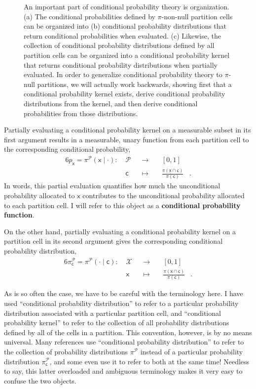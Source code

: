 \documentclass[
  letterpaper,
  DIV=11,
  numbers=noendperiod]{scrartcl}
\begin{document}
\begin{figure}
\caption{\label{fig-conditional-organization}An important part of
conditional probability theory is organization. (a) The conditional
probabilities defined by \(\pi\)-non-null partition cells can be
organized into (b) conditional probability distributions that return
conditional probabilities when evaluated. (c) Likewise, the collection
of conditional probability distributions defined by all partition cells
can be organized into a conditional probability kernel that returns
conditional probability distributions when partially evaluated. In order
to generalize conditional probability theory to \(\pi\)-null partitions,
we will actually work backwards, showing first that a conditional
probability kernel exists, derive conditional probability distributions
from the kernel, and then derive conditional probabilities from those
distributions.}

\end{figure}%

Partially evaluating a conditional probability kernel on a measurable
subset in its first argument results in a measurable, unary function
from each partition cell to the corresponding conditional probability,
\begin{alignat*}{6}
p_{\mathsf{x}}
=
\pi^{\mathcal{P}}( \mathsf{x} \mid \cdot )
:\; &\mathcal{P}& &\rightarrow& \; &[0, 1]&
\\
&\mathsf{c}& &\mapsto&
&\frac{ \pi(\mathsf{x} \cap \mathsf{c}) }{ \pi (\mathsf{c}) }&.
\end{alignat*} In words, this partial evaluation quantifies how much the
unconditional probability allocated to \(\mathsf{x}\) contributes to the
unconditional probability allocated to each partition cell. I will refer
to this object as a \textbf{conditional probability function}.

On the other hand, partially evaluating a conditional probability kernel
on a partition cell in its second argument gives the corresponding
conditional probability distribution, \begin{alignat*}{6}
\pi^{\mathcal{P}}_{\mathsf{c}}
=
\pi^{\mathcal{P}}( \cdot \mid \mathsf{c} )
:\; &\mathcal{X}& &\rightarrow& \; &[0, 1]&
\\
&\mathsf{x}& &\mapsto&
&\frac{ \pi(\mathsf{x} \cap \mathsf{c}) }{ \pi (\mathsf{c}) }&.
\end{alignat*}

As is so often the case, we have to be careful with the terminology
here. I have used ``conditional probability distribution'' to refer to a
particular probability distribution associated with a particular
partition cell, and ``conditional probability kernel'' to refer to the
collection of all probability distributions defined by all of the cells
in a partition. This convention, however, is by no means universal. Many
references use ``conditional probability distribution'' to refer to the
collection of probability distributions \(\pi^{\mathcal{P}}\) instead of
a particular probability distribution
\(\pi^{\mathcal{P}}_{\mathsf{c}}\), and some even use it to refer to
both at the same time! Needless to say, this latter overloaded and
ambiguous terminology makes it very easy to confuse the two objects.
\end{document}
